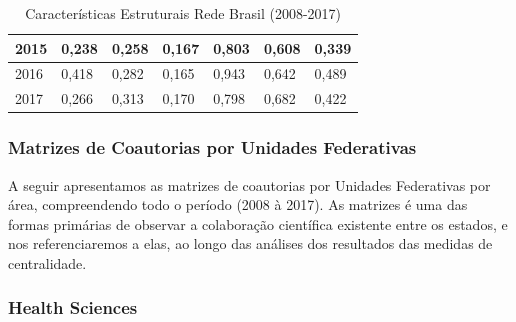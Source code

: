 \begin{table}[H]
\begin{tabular}{|l|l|l|l|l|l|l|}
		2015 & 0,238                                                      & 0,258                                                            & 0,167                                                               & 0,803                                                      & 0,608                                                            & 0,339                                                               \\ \hline
		2016 & 0,418                                                      & 0,282                                                            & 0,165                                                               & 0,943                                                      & 0,642                                                            & 0,489                                                               \\ \hline
		2017 & 0,266                                                      & 0,313                                                            & 0,170                                                                & 0,798                                                      & 0,682                                                            & 0,422                                                               \\ \hline
	\end{tabular}
\caption{Características Estruturais Rede Brasil (2008-2017)}
\label{estruturais}
\end{table}


\subsubsection{\textbf{Matrizes de Coautorias por Unidades Federativas}}

A seguir apresentamos as matrizes de coautorias por Unidades Federativas por área, compreendendo todo o período (2008 à 2017). As matrizes é uma das formas primárias de observar a colaboração científica existente entre os estados, e nos referenciaremos a elas, ao longo das análises dos resultados das medidas de centralidade.

\subsubsection{Health Sciences}


